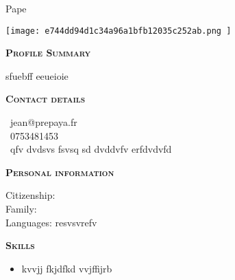\documentclass[11pt,a4paper]{article}
\newcommand{\headleft}[1]{\vspace*{3ex}\textsc{\textbf{#1}}\par%
    \vspace*{-1.5ex}\hrulefill\par\vspace*{0.7ex}}
\begin{document}
\setlength{\topskip}{0pt}\setlength{\parindent}{0pt}\setlength{\parskip}{0pt}
\setlength{\fboxsep}{0pt}\pagestyle{empty}\raggedbottom

\begin{minipage}[t]{0.33\textwidth}
\colorbox{cvblue}{\begin{minipage}[t][5mm][t]{\textwidth}\null\hfill\null\end{minipage}}
\vspace{-.2ex}
\colorbox{cvblue!90}{\color{white}
\textwidth
\begin{minipage}[t][293mm][t]{0.82\textwidth}\raggedright
\vspace*{2.5ex}

\Large Pape \textbf{\textscFALL} \normalsize


\null\hfill\texttt{[image:  e744dd94d1c34a96a1bfb12035c252ab.png ]}\hfill\null


\vspace*{0.5ex}

\headleft{Profile Summary}
sfuebff eeueioie

\headleft{Contact details}\small
\MVAt\ {\small jean@prepaya.fr} \\[0.4ex]
\Mobilefone\ 0753481453 \\[0.5ex]
\Letter\ qfv dvdsvs fsvsq sd dvddvfv erfdvdvfd
\normalsize

\headleft{Personal information}
Citizenship: \textbfsenegalaise \\[0.5ex]
Family:  \\[0.5ex]
Languages: \textbfrrerrg resvsvrefv

\headleft{Skills}
\begin{itemize}

  \item kvvjj fkjdfkd vvjffijrb

\end{itemize}

\end{minipage}\textwidth
}
\end{minipage}
\end{document}
